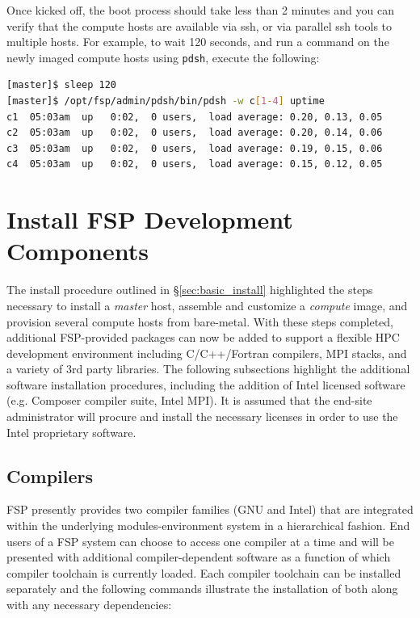 \documentclass[letterpaper]{article}
\begin{document}

Once kicked off, the boot process should take less than 2 minutes and you can
verify that the compute hosts are available via ssh, or via parallel ssh tools to multiple
hosts. For example, to wait 120 seconds, and run a command on the newly imaged
compute hosts using \texttt{pdsh}, execute the following:

\begin{lstlisting}[language=bash]
[master]$ sleep 120
[master]$ /opt/fsp/admin/pdsh/bin/pdsh -w c[1-4] uptime
c1  05:03am  up   0:02,  0 users,  load average: 0.20, 0.13, 0.05
c2  05:03am  up   0:02,  0 users,  load average: 0.20, 0.14, 0.06
c3  05:03am  up   0:02,  0 users,  load average: 0.19, 0.15, 0.06
c4  05:03am  up   0:02,  0 users,  load average: 0.15, 0.12, 0.05
\end{lstlisting}



\section{Install FSP Development Components}

The install procedure outlined in \S\ref{sec:basic_install}
highlighted the steps necessary to install a {\em master} host,
assemble and customize a {\em compute} image, and provision several
compute hosts from bare-metal.  With these steps completed, 
additional FSP-provided packages can now be added to support a flexible HPC
development environment including C/C++/Fortran compilers, MPI stacks, and a
variety of 3rd party libraries. The following subsections highlight the
additional software installation procedures, including the addition of Intel
licensed software (e.g. Composer compiler suite, Intel MPI). It is assumed that
the end-site administrator will procure and install the necessary licenses in
order to use the Intel proprietary software.

\subsection{Compilers}

FSP presently provides two compiler families ({GNU} and {Intel}) that are
integrated within the underlying modules-environment system in a hierarchical
fashion. End users of a FSP system can choose to access one compiler at a time
and will be presented with additional compiler-dependent software as a function
of which compiler toolchain is currently loaded. Each compiler toolchain can be
installed separately and the following commands illustrate the installation of
both along with any necessary dependencies:
\end{document}
